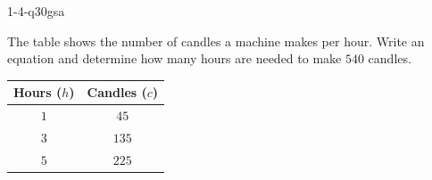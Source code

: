 \begin{practiceQuestion}{1-4-q30}{gsa}
\begin{questionText}
The table shows the number of candles a machine makes per hour. Write an equation and determine how many hours are needed to make $540$ candles.

\begin{center}
\begin{tabular}{|c|c|}
\hline
\textbf{Hours ($h$)} & \textbf{Candles ($c$)} \\ \hline
$1$ & $45$ \\ \hline
$3$ & $135$ \\ \hline
$5$ & $225$ \\ \hline
\end{tabular}
\end{center}
\end{questionText}
\end{practiceQuestion}
